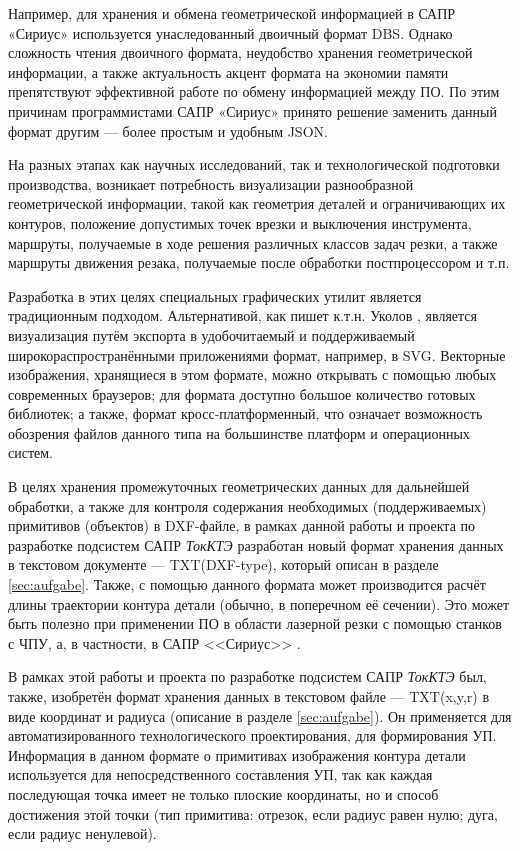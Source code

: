 Например, для хранения и обмена геометрической информацией в САПР «Сириус» используется унаследованный двоичный формат DBS. Однако сложность чтения двоичного формата, неудобство хранения геометрической информации, а также актуальность акцент формата на экономии памяти препятствуют эффективной работе по обмену информацией между ПО. По этим причинам программистами САПР «Сириус» принято решение заменить данный формат другим --- более простым и удобным JSON.

На разных этапах как научных исследований, так и технологической подготовки производства, возникает потребность визуализации разнообразной геометрической информации, такой как геометрия деталей и ограничивающих их контуров, положение допустимых точек врезки и выключения инструмента, маршруты, получаемые в ходе решения различных классов задач резки, а также маршруты движения резака, получаемые после обработки постпроцессором и т.п.

Разработка в этих целях специальных графических утилит является традиционным подходом. Альтернативой, как пишет к.т.н. Уколов \cite{ukoloff}, является визуализация путём экспорта в удобочитаемый и поддерживаемый широкораспространёнными приложениями формат, например, в SVG. Векторные изображения, хранящиеся в этом формате, можно открывать с помощью любых современных браузеров; для формата доступно большое количество готовых библиотек; а также, формат кросс-платформенный, что означает возможность обозрения файлов данного типа на большинстве платформ и операционных систем.

В целях хранения промежуточных геометрических данных для дальнейшей обработки, а также для контроля содержания необходимых (поддерживаемых) примитивов (объектов) в DXF-файле, в рамках данной работы и проекта по разработке подсистем САПР \textit{ТокКТЭ} разработан новый формат хранения данных в текстовом документе --- TXT(DXF-type), который описан в разделе \ref{sec:aufgabe}. Также, с помощью данного формата может производится расчёт длины траектории  контура детали (обычно, в поперечном её сечении). Это может быть полезно при применении ПО в области лазерной резки с помощью станков с ЧПУ, а, в частности, в САПР <<Сириус>> \cite{petunin}.

В рамках этой работы и проекта по разработке подсистем САПР \textit{ТокКТЭ} был, также, изобретён формат хранения данных в текстовом файле --- TXT(x,y,r) в виде координат и радиуса (описание в разделе \ref{sec:aufgabe}). Он применяется для автоматизированного технологического проектирования, для формирования УП. Информация в данном формате о примитивах изображения контура детали используется для непосредственного составления УП, так как каждая последующая точка имеет не только плоские координаты, но и способ достижения этой точки (тип примитива: отрезок, если радиус равен нулю; дуга, если радиус ненулевой).

